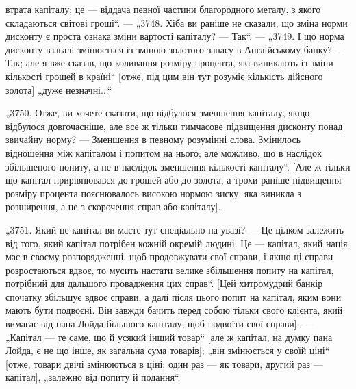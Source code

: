 \parcont{}  %
втрата капіталу; це — віддача певної частини благородного металу, з якого складаються світові
гроші“. — „3748. Хіба ви раніше
не сказали, що зміна норми дисконту є проста ознака зміни вартості капіталу? — Так“. — „3749. І що
норма дисконту взагалі
змінюється із зміною золотого запасу в Англійському банку? —
Так; але я вже сказав, що коливання розміру процента, які виникають із зміни кількості грошей в
країні“ [отже, під цим він
тут розуміє кількість дійсного золота] „дуже незначні...“

„3750. Отже, ви хочете сказати, що відбулося зменшення капіталу, якщо відбулося довгочасніше, але
все ж тільки тимчасове підвищення дисконту понад звичайну норму? — Зменшення
в певному розумінні слова. Змінилось відношення між капіталом
і попитом на нього; але можливо, що в наслідок збільшеного
попиту, а не в наслідок зменшення кількості капіталу“. [Але ж
тільки що капітал прирівнювався до грошей або до золота, а трохи
раніше підвищення розміру процента пояснювалось високою нормою зиску, яка виникла з розширення, а не
з скорочення справ
або капіталу].

„3751. Який це капітал ви маєте тут спеціально на увазі? —
Це цілком залежить від того, який капітал потрібен кожній
окремій людині. Це — капітал, який нація має в своєму розпорядженні, щоб продовжувати свої справи, і
якщо ці справи розростаються вдвоє, то мусить настати велике збільшення попиту
на капітал, потрібний для дальшого провадження цих справ“. [Цей
хитромудрий банкір спочатку збільшує вдвоє справи, а далі після
цього попит на капітал, яким вони мають бути подвоєні. Він
завжди бачить перед собою тільки свого клієнта, який вимагає
від пана Лойда більшого капіталу, щоб подвоїти свої справи]. —
„Капітал — те саме, що й усякий інший товар“ [але ж капітал, на думку пана Лойда, є не що інше, як
загальна сума товарів]; „він змінюється у своїй ціні“ [отже, товари двічі змінюються
в ціні: один раз — як товари, другий раз — капітал], „залежно
від попиту й подання“.

